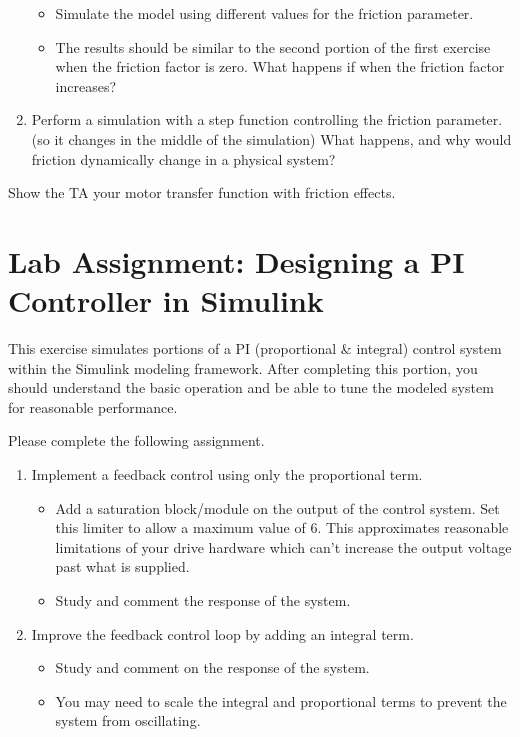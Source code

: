 \documentclass[openany,11pt,fleqn]{book} %
\begin{document}
\begin{exercise}
\begin{enumerate}
	    \begin{itemize}
	        \item Simulate the model using different values for the friction parameter.
	        \item The results should be similar to the second portion of the first exercise when the friction factor is zero. What happens if when the friction factor increases?
	    \end{itemize}
	    \item Perform a simulation with a step function controlling the friction parameter. (so it changes in the middle of the simulation) What happens, and why would friction dynamically change in a physical system? 
	\end{enumerate}
\end{exercise}

\begin{assignment}
	Show the TA your motor transfer function with friction effects.
\end{assignment}

\section{\color{blue}Lab Assignment: Designing a PI Controller in Simulink}
This exercise simulates portions of a PI (proportional \& integral) control system within the Simulink modeling framework. After completing this portion, you should understand the basic operation and be able to tune the modeled system for reasonable performance. 

\begin{exercise} Please complete the following assignment.
	\begin{enumerate}
	    \item Implement a feedback control using only the proportional term. 
	    \begin{itemize}
	        \item Add a saturation block/module on the output of the control system. Set this limiter to allow a maximum value of 6. This approximates reasonable limitations of your drive hardware which can't increase the output voltage past what is supplied.  
	        \item Study and comment the response of the system.
	    \end{itemize}
	    \item Improve the feedback control loop by adding an integral term. 
	    \begin{itemize}
	        \item Study and comment on the response of the system.
	        \item You may need to scale the integral and proportional terms to prevent the system from oscillating.
	    \end{itemize}
	\end{enumerate}
\end{exercise}
\end{document}
